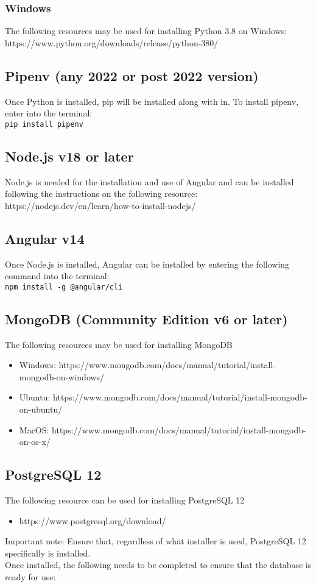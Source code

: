 \documentclass{article}
\newcommand{\code}[1]{\colorbox{light-gray}{\texttt{#1}}}
\begin{document}
\subsubsection{Windows}
The following resources may be used for installing Python 3.8 on Windows:
https://www.python.org/downloads/release/python-380/

\subsection{Pipenv (any 2022 or post 2022 version)}
Once Python is installed, pip will be installed along with in. To install pipenv, enter into the terminal:\\
\code{pip install pipenv}

\subsection{Node.js v18 or later}
Node.js is needed for the installation and use of Angular and can be installed
following the instructions on the following resource:\\
https://nodejs.dev/en/learn/how-to-install-nodejs/

\subsection{Angular v14}
Once Node.js is installed, Angular can be installed by entering the following command into the terminal:\\
\code{npm install -g @angular/cli}

\subsection{MongoDB (Community Edition v6 or later)}
The following resources may be used for installing MongoDB
\begin{itemize}
    \item Windows: https://www.mongodb.com/docs/manual/tutorial/install-mongodb-on-windows/
    \item Ubuntu: https://www.mongodb.com/docs/manual/tutorial/install-mongodb-on-ubuntu/
    \item MacOS: https://www.mongodb.com/docs/manual/tutorial/install-mongodb-on-os-x/
\end{itemize}

\subsection{PostgreSQL 12}
The following resource can be used for installing PostgreSQL 12
\begin{itemize}
    \item https://www.postgresql.org/download/
\end{itemize}
Important note: Ensure that, regardless of what installer is used, PostgreSQL 12 specifically is installed.\\
Once installed, the following needs to be completed to ensure that the database is ready for use:
\end{document}
